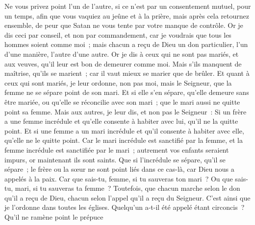 \begin{multicols}{2}
Ne vous privez point l'un de l'autre, si ce n'est par un consentement mutuel, pour un temps, afin que vous vaquiez au jeûne et à la prière, mais après cela retournez ensemble, de peur que Satan ne vous tente par votre manque de contrôle.
Or je dis ceci par conseil, et non par commandement,
car je voudrais que tous les hommes soient comme moi~; mais chacun a reçu de Dieu un don particulier, l'un d'une manière, l'autre d'une autre.
Or je dis à ceux qui ne sont pas mariés, et aux veuves, qu'il leur est bon de demeurer comme moi.
Mais s'ils manquent de maîtrise, qu'ils se marient~; car il vaut mieux se marier que de brûler.
Et quant à ceux qui sont mariés, je leur ordonne, non pas moi, mais le Seigneur, que la femme ne se sépare point de son mari.
Et si elle s'en sépare, qu'elle demeure sans être mariée, ou qu'elle se réconcilie avec son mari~; que le mari aussi ne quitte point sa femme.
Mais aux autres, je leur dis, et non pas le Seigneur~: Si un frère a une femme incrédule et qu'elle consente à habiter avec lui, qu'il ne la quitte point.
Et si une femme a un mari incrédule et qu'il consente à habiter avec elle, qu'elle ne le quitte point.
Car le mari incrédule est sanctifié par la femme, et la femme incrédule est sanctifiée par le mari~; autrement vos enfants seraient impurs, or maintenant ils sont saints.
Que si l'incrédule se sépare, qu'il se sépare~; le frère ou la sœur ne sont point liés dans ce cas-là, car Dieu nous a appelés à la paix.
Car que sais-tu, femme, si tu sauveras ton mari~? Ou que sais-tu, mari, si tu sauveras ta femme~?
Toutefois, que chacun marche selon le don qu'il a reçu de Dieu, chacun selon l'appel qu'il a reçu du Seigneur. C'est ainsi que je l'ordonne dans toutes les églises.
Quelqu'un a-t-il été appelé étant circoncis~? Qu'il ne ramène point le prépuce
\end{multicols}
